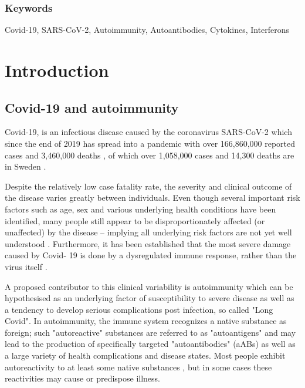 \documentclass{article}
\begin{document}
\vspace{2cm}
\subsubsection*{Keywords}
Covid-19, SARS-CoV-2, Autoimmunity, Autoantibodies, Cytokines, Interferons

\newpage
\tableofcontents

\newpage
\section{Introduction}
\subsection{Covid-19 and autoimmunity}
Covid-19, is an infectious disease caused by the coronavirus SARS-CoV-2 which since the end of 2019 has spread into a pandemic with over 166,860,000 reported cases and 3,460,000 deaths \cite{who_report}, of which over 1,058,000 cases and 14,300 deaths are in Sweden \cite{fohm}.

Despite the relatively low case fatality rate, the severity and clinical outcome of the disease varies greatly between individuals. Even though several important risk factors such as age, sex and various underlying health conditions have been identified, many people still appear to be disproportionately affected (or unaffected) by the disease – implying all underlying risk factors are not yet well understood \cite{susceptibility}. Furthermore, it has been established that the most severe damage caused by Covid- 19 is done by a dysregulated immune response, rather than the virus itself \cite{dysregulated}.

A proposed contributor to this clinical variability is autoimmunity which can be hypothesised as an underlying factor of susceptibility to severe disease as well as a tendency to develop serious complications post infection, so called "Long Covid". In autoimmunity, the immune system recognizes a native substance as foreign; such "autoreactive" substances are referred to as "autoantigens" and may lead to the production of specifically targeted "autoantibodies" (aABs) as well as a large variety of health complications and disease states. Most people exhibit autoreactivity to at least some native substances \cite{aa_healthy}, but in some cases these reactivities may cause or predispose illness.
\end{document}
